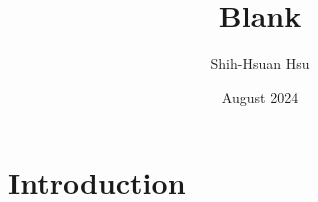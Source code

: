 \documentclass{article}
\title{Blank}
\author{Shih-Hsuan Hsu}
\date{August 2024}
\begin{document}
\maketitle

\section{Introduction}


\end{document}
